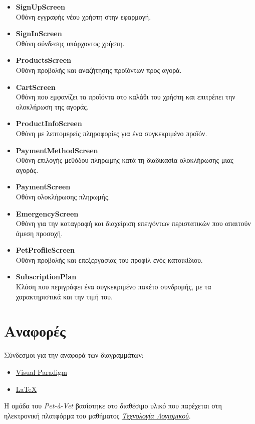 \documentclass[12pt,a4paper,twoside]{book}
\begin{document}
\begin{itemize}
    \item \textbf{SignUpScreen}\\
          Οθόνη εγγραφής νέου χρήστη στην εφαρμογή.
    \item \textbf{SignInScreen}\\
          Οθόνη σύνδεσης υπάρχοντος χρήστη. %
    \item \textbf{ProductsScreen}\\
          Οθόνη προβολής και αναζήτησης προϊόντων προς αγορά.
    \item \textbf{CartScreen}\\
          Οθόνη που εμφανίζει τα προϊόντα στο καλάθι του χρήστη και επιτρέπει την ολοκλήρωση της αγοράς.
    \item \textbf{ProductInfoScreen}\\
          Οθόνη με λεπτομερείς πληροφορίες για ένα συγκεκριμένο προϊόν.
    \item \textbf{PaymentMethodScreen}\\
          Οθόνη επιλογής μεθόδου πληρωμής κατά τη διαδικασία ολοκλήρωσης μιας αγοράς. %
    \item \textbf{PaymentScreen}\\
          Οθόνη ολοκλήρωσης πληρωμής.
    \item \textbf{EmergencyScreen}\\
          Οθόνη για την καταγραφή και διαχείριση επειγόντων περιστατικών που απαιτούν άμεση προσοχή. %
    \item \textbf{PetProfileScreen}\\
          Οθόνη προβολής και επεξεργασίας του προφίλ ενός κατοικίδιου. %
    \item \textbf{SubscriptionPlan}\\
          Κλάση που περιγράφει ένα συγκεκριμένο πακέτο συνδρομής, με τα χαρακτηριστικά και την τιμή του. %
\end{itemize}

\chapter{Αναφορές}

Σύνδεσμοι για την αναφορά των διαγραμμάτων: %
\begin{itemize}
    \item \href{https://www.visual-paradigm.com/}{Visual Paradigm}
    \item \href{https://www.latex-project.org/}{LaTeX}
\end{itemize}

Η ομάδα του \textit{Pet-à-Vet} βασίστηκε στο διαθέσιμο υλικό που παρέχεται στη ηλεκτρονική πλατφόρμα του μαθήματος \href{https://eclass.upatras.gr/courses/CEID1030/}{\textit{Τεχνολογία Λογισμικού}}. %
\end{document}
